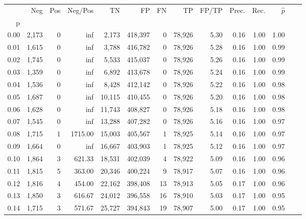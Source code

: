\begin{tabular}{rrrrrrrrrrrrrr}
\toprule
{} &    Neg &    Pos &  Neg/Pos &       TN &       FP &      FN &      TP & FP/TP & Prec. &  Rec. & $\hat{p}$ \\
p    &        &        &          &          &          &         &         &       &       &       &           \\
\midrule
0.00 &  2,173 &      0 &      inf &    2,173 &  418,397 &       0 &  78,926 &  5.30 &  0.16 &  1.00 &      1.00 \\
0.01 &  1,615 &      0 &      inf &    3,788 &  416,782 &       0 &  78,926 &  5.28 &  0.16 &  1.00 &      0.99 \\
0.02 &  1,745 &      0 &      inf &    5,533 &  415,037 &       0 &  78,926 &  5.26 &  0.16 &  1.00 &      0.99 \\
0.03 &  1,359 &      0 &      inf &    6,892 &  413,678 &       0 &  78,926 &  5.24 &  0.16 &  1.00 &      0.99 \\
0.04 &  1,536 &      0 &      inf &    8,428 &  412,142 &       0 &  78,926 &  5.22 &  0.16 &  1.00 &      0.98 \\
0.05 &  1,687 &      0 &      inf &   10,115 &  410,455 &       0 &  78,926 &  5.20 &  0.16 &  1.00 &      0.98 \\
0.06 &  1,628 &      0 &      inf &   11,743 &  408,827 &       0 &  78,926 &  5.18 &  0.16 &  1.00 &      0.98 \\
0.07 &  1,545 &      0 &      inf &   13,288 &  407,282 &       0 &  78,926 &  5.16 &  0.16 &  1.00 &      0.97 \\
0.08 &  1,715 &      1 &  1715.00 &   15,003 &  405,567 &       1 &  78,925 &  5.14 &  0.16 &  1.00 &      0.97 \\
0.09 &  1,664 &      0 &      inf &   16,667 &  403,903 &       1 &  78,925 &  5.12 &  0.16 &  1.00 &      0.97 \\
0.10 &  1,864 &      3 &   621.33 &   18,531 &  402,039 &       4 &  78,922 &  5.09 &  0.16 &  1.00 &      0.96 \\
0.11 &  1,815 &      5 &   363.00 &   20,346 &  400,224 &       9 &  78,917 &  5.07 &  0.16 &  1.00 &      0.96 \\
0.12 &  1,816 &      4 &   454.00 &   22,162 &  398,408 &      13 &  78,913 &  5.05 &  0.17 &  1.00 &      0.96 \\
0.13 &  1,850 &      3 &   616.67 &   24,012 &  396,558 &      16 &  78,910 &  5.03 &  0.17 &  1.00 &      0.95 \\
0.14 &  1,715 &      3 &   571.67 &   25,727 &  394,843 &      19 &  78,907 &  5.00 &  0.17 &  1.00 &      0.95 \\

\end{tabular}
